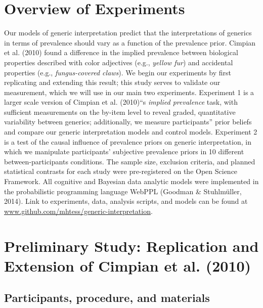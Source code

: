 \documentclass[floatsintext,doc]{apa6}
\begin{document}
\hypertarget{overview-of-experiments}{%
\section{Overview of Experiments}\label{overview-of-experiments}}

Our models of generic interpretation predict that the interpretations of generics in terms of prevalence should vary as a function of the prevalence prior.
Cimpian et al. (2010) found a difference in the implied prevalence between biological properties described with color adjectives (e.g., \emph{yellow fur}) and accidental properties (e.g., \emph{fungus-covered claws}).
We begin our experiments by first replicating and extending this result; this study serves to validate our measurement, which we will use in our main two experiments.
Experiment 1 is a larger scale version of Cimpian et al. (2010)\enquote{s \emph{implied prevalence} task, with sufficient measurements on the by-item level to reveal graded, quantitative variability between generics; additionally, we measure participants} prior beliefs and compare our generic interpretation models and control models.
Experiment 2 is a test of the causal influence of prevalence priors on generic interpretation, in which we manipulate participants' subjective prevalence priors in 10 different between-participants conditions.
The sample size, exclusion criteria, and planned statistical contrasts for each study were pre-registered on the Open Science Framework.
All cognitive and Bayesian data analytic models were implemented in the probabilistic programming language WebPPL (Goodman \& Stuhlmüller, 2014).
Link to experiments, data, analysis scripts, and models can be found at \url{www.github.com/mhtess/generic-interpretation}.

\hypertarget{preliminary-study-replication-and-extension-of-cimpian-et-al.-2010}{%
\section{Preliminary Study: Replication and Extension of Cimpian et al. (2010)}\label{preliminary-study-replication-and-extension-of-cimpian-et-al.-2010}}


\hypertarget{participants}{%
\subsection{Participants, procedure, and materials}\label{participants}}
\end{document}

